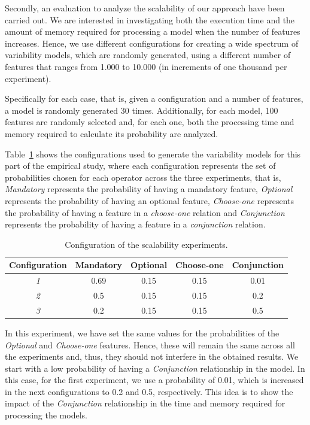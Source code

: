 Secondly, an evaluation to analyze the scalability of our approach
have been carried out. We are interested in investigating both the
execution time and the amount of memory required for processing a model
when the number of features increases.
Hence, we use different configurations for creating a wide
spectrum of variability models, which are randomly generated,
using a different number of features that ranges from 1.000 to 10.000 (in increments of one thousand per experiment).

Specifically for each case, that is, given a configuration and a number of features,
a model is randomly generated 30 times.
Additionally, for each model, 100 features are
randomly selected and, for each one, both the processing time and memory
required to calculate its probability are analyzed.



Table~\ref{scalaExperiment} shows the configurations used to generate the
variability models for this part of the empirical study,
where each configuration represents the set of probabilities chosen for each operator across the three experiments,
that is, \textit{Mandatory} represents the probability of having a mandatory feature,
 \textit{Optional} represents the probability of having an optional feature,
 \textit{Choose-one} represents the probability of having a feature in a \textit{choose-one} relation and
 \textit{Conjunction} represents the probability of having a feature in a \textit{conjunction} relation.

\begin{table}[h]
\centering
\begin{tabular}{|c|c|c|c|c|}
\hline
\textbf{Configuration} & \textbf{Mandatory} &  \textbf{Optional} &  \textbf{Choose-one} &  \textbf{Conjunction} \\ \hline
        \textit{1}              & 0.69  & 0.15  & 0.15  & 0.01  \\ \hline
        \textit{2}              & 0.5           & 0.15  & 0.15  & 0.2           \\ \hline
        \textit{3}              & 0.2           & 0.15  & 0.15  & 0.5   \\ \hline
\end{tabular}
\caption{Configuration of the scalability experiments.}
\label{scalaExperiment}
\end{table}

In this experiment, we have set the same values for the probabilities of the \textit{Optional}
and \textit{Choose-one} features. Hence, these will remain the same
across all the experiments and, thus, they should not interfere in the obtained results.
We start with a low probability of having a \textit{Conjunction} relationship in the model. In this
case, for the first experiment, we use a probability of 0.01, which is increased in the next configurations
to 0.2 and 0.5, respectively. This idea is to show the impact of the \textit{Conjunction} relationship in the time
and memory required for processing the models.

